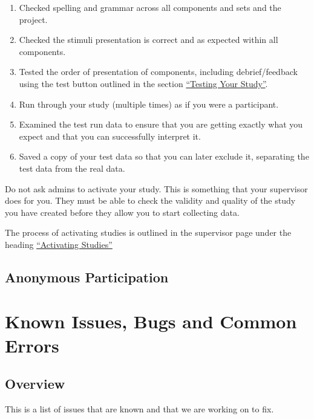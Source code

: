 \documentclass[]{book}
\providecommand{\tightlist}{%
  \setlength{\itemsep}{0pt}\setlength{\parskip}{0pt}}
\begin{document}
\begin{enumerate}
\def\labelenumi{\arabic{enumi}.}
\tightlist
\item
  Checked spelling and grammar across all components and sets and the
  project.
\item
  Checked the stimuli presentation is correct and as expected within all
  components.
\item
  Tested the order of presentation of components, including
  debrief/feedback using the test button outlined in the section
  \protect\hyperlink{testingyourstudy}{``Testing Your Study''}.
\item
  Run through your study (multiple times) as if you were a participant.
\item
  Examined the test run data to ensure that you are getting exactly what
  you expect and that you can successfully interpret it.
\item
  Saved a copy of your test data so that you can later exclude it,
  separating the test data from the real data.
\end{enumerate}

\begin{info}
Do not ask admins to activate your study. This is something that your
supervisor does for you. They must be able to check the validity and
quality of the study you have created before they allow you to start
collecting data.
\end{info}

The process of activating studies is outlined in the supervisor page
under the heading \protect\hyperlink{activating}{``Activating Studies''}

\section{Anonymous Participation}\label{anon}

\hypertarget{knownissues}{\chapter*{Known Issues, Bugs and Common
Errors}\label{knownissues}}

\section*{Overview}\label{overview-7}

This is a list of issues that are known and that we are working on to
fix.
\end{document}
